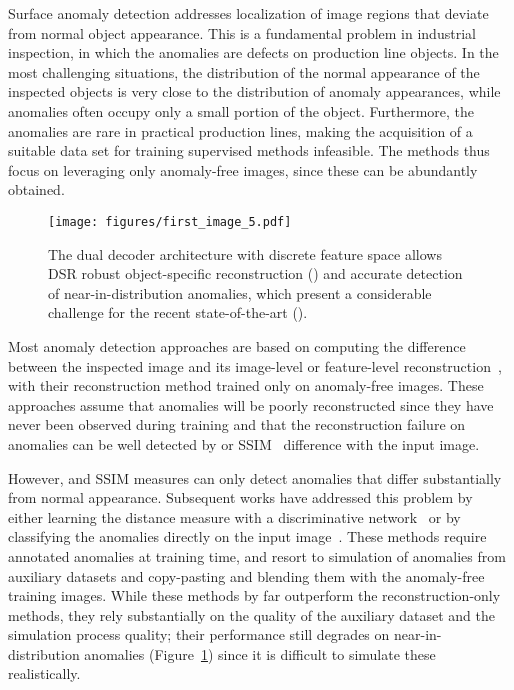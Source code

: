 \documentclass[runningheads]{llncs}
\begin{document}
Surface anomaly detection addresses localization of image regions that deviate from normal object appearance. This is a fundamental problem in industrial inspection, in which the anomalies are defects on production line objects. In the most challenging situations, the distribution of the normal appearance of the inspected objects is very close to the distribution of anomaly appearances, while anomalies often occupy only a small portion of the object. Furthermore, the anomalies are rare in practical production lines, making the acquisition of a suitable data set for training supervised methods infeasible. The methods thus focus on leveraging only anomaly-free images, since these can be abundantly obtained.


\begin{figure}
\centering
  \texttt{[image: figures/first\_image\_5.pdf]}
\caption{
The dual decoder architecture with discrete feature space allows DSR robust object-specific reconstruction () and accurate detection of near-in-distribution anomalies, which present a considerable challenge for the recent state-of-the-art ().
}
\label{fig:first}
\end{figure}

Most anomaly detection approaches are based on computing the difference between the inspected image and its image-level or feature-level reconstruction~\cite{akcay2018ganomaly,akccay2019skip,schlegl2019f,bergmann2018improving,zavrtanik2020riad,bergmann2019mvtec}, with their reconstruction method trained only on anomaly-free images. These approaches assume that anomalies will be poorly reconstructed since they have never been observed during training and that the reconstruction failure on anomalies can be well detected by  or SSIM~\cite{wang2004image} difference with the input image.


However,  and SSIM measures can only detect anomalies that differ substantially from normal appearance.
Subsequent works have addressed this problem by either learning the distance measure with a discriminative network~\cite{zavrtanik2021draem} or by classifying the anomalies directly on the input image~\cite{li2021cutpaste}. These methods require annotated anomalies at training time, and resort to simulation of anomalies from auxiliary datasets and copy-pasting and blending them with the anomaly-free training images.
While these methods by far outperform the reconstruction-only methods, they rely substantially on the quality of the auxiliary dataset and the simulation process quality; their performance still degrades on near-in-distribution anomalies (Figure~\ref{fig:first}) since it is difficult to simulate these realistically.
 
\end{document}
